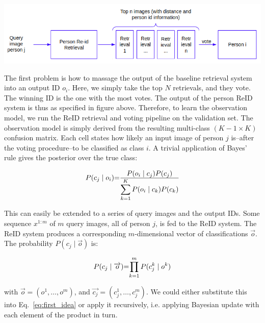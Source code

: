 \documentclass[10pt,a4paper,final]{article}
\begin{document}
\includegraphics[width=\textwidth]{figures/first_idea.png}

The first problem is how to massage the output of the baseline retrieval system into an output ID $o_i$. Here, we simply take the top $N$ retrievals, and they vote. The winning ID is the one with the most votes. The output of the person ReID system is thus as specified in figure above. Therefore, to learn the observation model, we run the ReID retrieval and voting pipeline on the validation set. The observation model is simply derived from the resulting multi-class $(K-1 \times K)$ confusion matrix. Each cell states how likely an input image of person $j$ is--after the voting procedure--to be classified as class $i$. A trivial application of Bayes' rule gives the posterior over the true class:

\begin{equation}
	\label{eq:first_idea}
	\begin{tabular}{r@{=}l}
		$P(c_j \mid o_i)$ & $\frac{\displaystyle P(o_i \mid c_j) P(c_j)}{\displaystyle\sum_{k=1}^{K} P(o_i \mid c_k) P(c_k)}$ \\ 
	\end{tabular}
\end{equation}

This can easily be extended to a series of query images and the output IDs. Some sequence $x^{1:m}$ of $m$ query images, all of person $j$, is fed to the ReID system. The ReID system produces a corresponding $m$-dimensional vector of classifications $\overrightarrow{o}$. The probability $P(c_j \mid \overrightarrow{o})$ is:

\begin{equation}
	\label{eq:joint_first_idea}
	\begin{tabular}{r@{=}l}
	$P(c_j \mid \overrightarrow{o})$ & $\displaystyle \prod_{k=1}^{m} P(c^k_{j} \mid o^k)$ \\ 
	\end{tabular}
\end{equation}

\noindent with $\overrightarrow{o} = (o^1, \ldots, o^{m})$, and $\overrightarrow{c_j} = (c^1_{j}, \ldots, c^m_{j})$. We could either substitute this into Eq.~\ref{eq:first_idea} or apply it recursively, i.e. applying Bayesian update with each element of the product in turn.%
\end{document}
